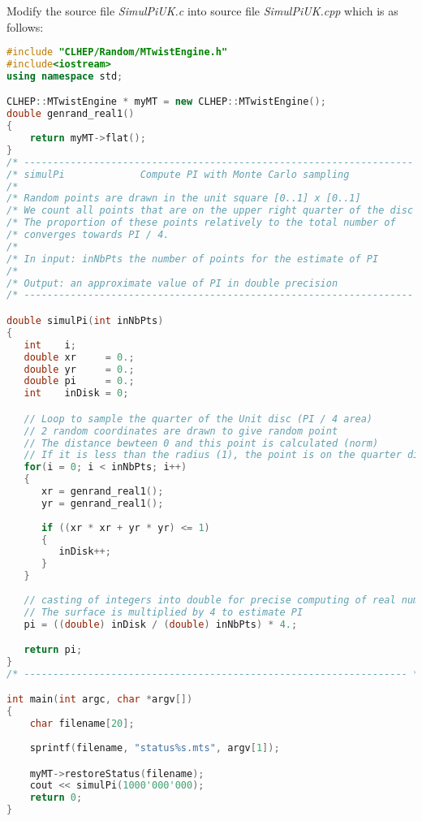 \documentclass[a4paper, 12pt]{report}
\begin{document}
Modify the source file \emph{SimulPiUK.c} into source file \emph{SimulPiUK.cpp} which is as follows:
\begin{lstlisting}[language=C++]
#include "CLHEP/Random/MTwistEngine.h"
#include<iostream>
using namespace std;

CLHEP::MTwistEngine * myMT = new CLHEP::MTwistEngine();
double genrand_real1()
{
	return myMT->flat();
}
/* ------------------------------------------------------------------- */
/* simulPi             Compute PI with Monte Carlo sampling            */
/*                                                                     */
/* Random points are drawn in the unit square [0..1] x [0..1]          */
/* We count all points that are on the upper right quarter of the disc */
/* The proportion of these points relatively to the total number of    */
/* converges towards PI / 4.                                           */
/*                                                                     */
/* In input: inNbPts the number of points for the estimate of PI       */
/*                                                                     */
/* Output: an approximate value of PI in double precision              */
/* ------------------------------------------------------------------- */

double simulPi(int inNbPts)
{
   int    i;
   double xr     = 0.;
   double yr     = 0.;
   double pi     = 0.;
   int    inDisk = 0;

   // Loop to sample the quarter of the Unit disc (PI / 4 area) 
   // 2 random coordinates are drawn to give random point
   // The distance bewteen 0 and this point is calculated (norm) 
   // If it is less than the radius (1), the point is on the quarter disc
   for(i = 0; i < inNbPts; i++)
   {
      xr = genrand_real1();
      yr = genrand_real1();
 
      if ((xr * xr + yr * yr) <= 1)
      {
         inDisk++;
      }
   }
   
   // casting of integers into double for precise computing of real numbers
   // The surface is multiplied by 4 to estimate PI
   pi = ((double) inDisk / (double) inNbPts) * 4.;

   return pi;
}
/* ------------------------------------------------------------------ */

int main(int argc, char *argv[])
{
	char filename[20];
	
	sprintf(filename, "status%s.mts", argv[1]);

	myMT->restoreStatus(filename);
	cout << simulPi(1000'000'000);
	return 0;
}

\end{lstlisting}
\end{document}
